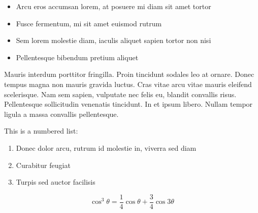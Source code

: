 \begin{itemize}
	\item Arcu eros accumsan lorem, at posuere mi diam sit amet tortor
	\item Fusce fermentum, mi sit amet euismod rutrum
	\item Sem lorem molestie diam, iaculis aliquet sapien tortor non nisi
	\item Pellentesque bibendum pretium aliquet
\end{itemize}

Mauris interdum porttitor fringilla. Proin tincidunt sodales leo at ornare. Donec tempus magna non mauris gravida luctus. Cras vitae arcu vitae mauris eleifend scelerisque. Nam sem sapien, vulputate nec felis eu, blandit convallis risus. Pellentesque sollicitudin venenatis tincidunt. In et ipsum libero. Nullam tempor ligula a massa convallis pellentesque.

This is a numbered list:

\begin{enumerate}
	\item Donec dolor arcu, rutrum id molestie in, viverra sed diam
	\item Curabitur feugiat
	\item Turpis sed auctor facilisis
\end{enumerate}

\begin{equation}
	\cos^3 \theta =\frac{1}{4}\cos\theta+\frac{3}{4}\cos 3\theta
	\label{eq:example}
\end{equation}